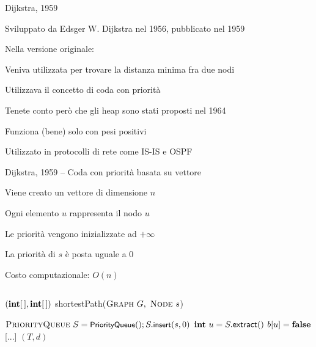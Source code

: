 \begin{frame}{Dijkstra, 1959}

\BIL
\item Sviluppato da Edsger W. Dijkstra nel 1956, pubblicato nel 1959
\item Nella versione originale:
  \BI
  \item Veniva utilizzata per trovare la distanza minima fra due nodi
  \item Utilizzava il concetto di coda con priorità
  \item Tenete conto però che gli heap sono stati proposti nel 1964
  \EI
\EIL

\bigskip
{}
\BIL
\item Funziona (bene) solo con pesi positivi
\item Utilizzato in protocolli di rete come IS-IS e OSPF
\EIL

\end{frame}


\begin{frame}{Dijkstra, 1959 -- Coda con priorità basata su vettore}

\smallskip
{}
\BI
\item Viene creato un vettore di dimensione $n$
\item Ogni elemento $u$ rappresenta il nodo $u$
\item Le priorità vengono inizializzate ad $+\infty$
\item La priorità di $s$ è posta uguale a $0$
\item Costo computazionale: $O(n)$
\EI

\vspace{-18pt}
\begin{columns}
\small
\begin{Procedure}
\caption[A]{$(\INTARRAY, \INTARRAY)$ \textsf{shortestPath}($\textsc{Graph}\ G,\ \textsc{Node}\ s$)}
\alert{$\textsc{PriorityQueue}\ S = \textsf{{\small PriorityQueue}}(); S.\textsf{{\small insert}}(s, 0)$}\;
{
  $\INTEGER\ u = S.\textsf{extract}()$\;
  $b[u] = \FALSE$\;
  {
    {
      [...]
    }
  }
}
\Return $(T,d)$
\end{Procedure}
\end{columns}




\end{frame}



